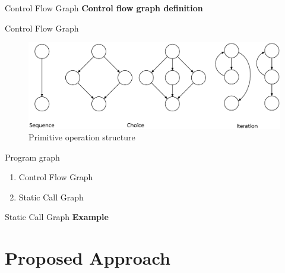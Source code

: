 \documentclass{beamer}
\begin{document}
\begin{frame}{Control Flow Graph}
    \textbf{Control flow graph definition}
    \parencite{Allen:1970:CFA:390013.808479}
\end{frame}

\begin{frame}{Control Flow Graph}
    \begin{figure}
        \includegraphics[width=0.7\paperwidth]{figure/Primitive-Operation-Structure.eps}
        \caption{Primitive operation structure \parencite{McCabe1976}}
        \label{fig:primitivestructure}
    \end{figure}
\end{frame}

\begin{frame}{Program graph}
    \begin{enumerate}
        \item<1-> Control Flow Graph
        \item<2-> Static Call Graph
    \end{enumerate}
\end{frame}

\begin{frame}{Static Call Graph}
    \textbf{Example}
\end{frame}


%
\section{Proposed Approach}
\end{document}
